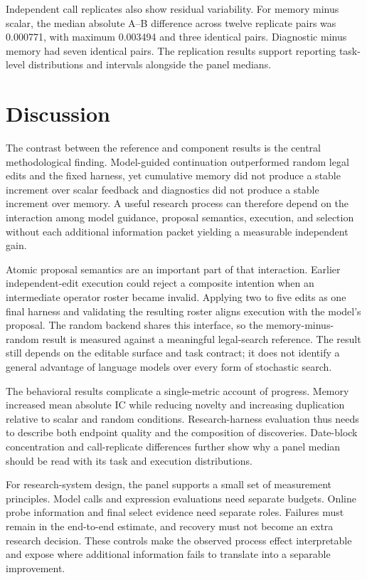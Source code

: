 Independent call replicates also show residual variability. For memory minus scalar, the median absolute A--B difference across twelve replicate pairs was 0.000771, with maximum 0.003494 and three identical pairs. Diagnostic minus memory had seven identical pairs. The replication results support reporting task-level distributions and intervals alongside the panel medians.

\section{Discussion}
\label{sec:discussion}

The contrast between the reference and component results is the central methodological finding. Model-guided continuation outperformed random legal edits and the fixed harness, yet cumulative memory did not produce a stable increment over scalar feedback and diagnostics did not produce a stable increment over memory. A useful research process can therefore depend on the interaction among model guidance, proposal semantics, execution, and selection without each additional information packet yielding a measurable independent gain.

Atomic proposal semantics are an important part of that interaction. Earlier independent-edit execution could reject a composite intention when an intermediate operator roster became invalid. Applying two to five edits as one final harness and validating the resulting roster aligns execution with the model's proposal. The random backend shares this interface, so the memory-minus-random result is measured against a meaningful legal-search reference. The result still depends on the editable surface and task contract; it does not identify a general advantage of language models over every form of stochastic search.

The behavioral results complicate a single-metric account of progress. Memory increased mean absolute IC while reducing novelty and increasing duplication relative to scalar and random conditions. Research-harness evaluation thus needs to describe both endpoint quality and the composition of discoveries. Date-block concentration and call-replicate differences further show why a panel median should be read with its task and execution distributions.

For research-system design, the panel supports a small set of measurement principles. Model calls and expression evaluations need separate budgets. Online probe information and final select evidence need separate roles. Failures must remain in the end-to-end estimate, and recovery must not become an extra research decision. These controls make the observed process effect interpretable and expose where additional information fails to translate into a separable improvement.

